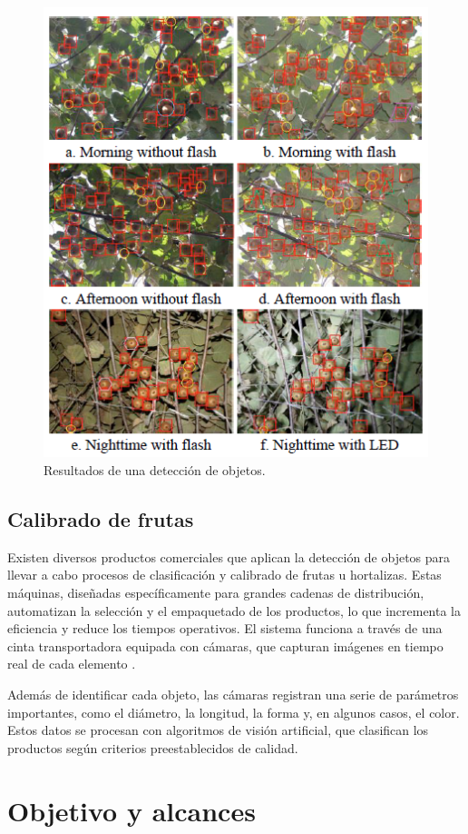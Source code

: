\begin{figure}[htbp]
	\centering
	\includegraphics[width=.5\textwidth]{./Figures/Song2019.png}
	\caption{Resultados de una detección de objetos\protect\footnotemark.}
	\label{fig:Song2019}
\end{figure}

\vspace{1cm}

\newpage
\subsection{Calibrado de frutas}

Existen diversos productos comerciales que aplican la detección de objetos para llevar a cabo procesos de clasificación y calibrado de frutas u hortalizas. Estas máquinas, diseñadas específicamente para grandes cadenas de distribución, automatizan la selección y el empaquetado de los productos, lo que incrementa la eficiencia y reduce los tiempos operativos. El sistema funciona a través de una cinta transportadora equipada con cámaras, que capturan imágenes en tiempo real de cada elemento \citep{WEBSITE:Unitec2024}.

Además de identificar cada objeto, las cámaras registran una serie de parámetros importantes, como el diámetro, la longitud, la forma y, en algunos casos, el color. Estos datos se procesan con algoritmos de visión artificial, que clasifican los productos según criterios preestablecidos de calidad.


\section{Objetivo y alcances}


